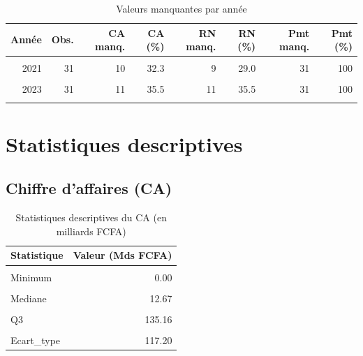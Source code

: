 \documentclass[
  12pt,
]{article}
\begin{document}
\begin{table}[!h]
\centering
\caption{\label{tab:miss-annee}Valeurs manquantes par année}
\centering
\begin{tabular}[t]{rrrrrrrr}
\toprule
Année & Obs. & CA manq. & CA (\%) & RN manq. & RN (\%) & Pmt manq. & Pmt (\%)\\
\midrule
\cellcolor{gray!10}{2020} & \cellcolor{gray!10}{31} & \cellcolor{gray!10}{18} & \cellcolor{gray!10}{58.1} & \cellcolor{gray!10}{18} & \cellcolor{gray!10}{58.1} & \cellcolor{gray!10}{31} & \cellcolor{gray!10}{100}\\
2021 & 31 & 10 & 32.3 & 9 & 29.0 & 31 & 100\\
\cellcolor{gray!10}{2022} & \cellcolor{gray!10}{31} & \cellcolor{gray!10}{9} & \cellcolor{gray!10}{29.0} & \cellcolor{gray!10}{9} & \cellcolor{gray!10}{29.0} & \cellcolor{gray!10}{31} & \cellcolor{gray!10}{100}\\
2023 & 31 & 11 & 35.5 & 11 & 35.5 & 31 & 100\\
\cellcolor{gray!10}{2024} & \cellcolor{gray!10}{31} & \cellcolor{gray!10}{17} & \cellcolor{gray!10}{54.8} & \cellcolor{gray!10}{17} & \cellcolor{gray!10}{54.8} & \cellcolor{gray!10}{31} & \cellcolor{gray!10}{100}\\
\bottomrule
\end{tabular}
\end{table}

\newpage

\section{Statistiques descriptives}\label{statistiques-descriptives}

\subsection{Chiffre d'affaires (CA)}\label{chiffre-daffaires-ca}

\begin{table}[!h]
\centering
\caption{\label{tab:stats-CA}Statistiques descriptives du CA (en milliards FCFA)}
\centering
\begin{tabular}[t]{lr}
\toprule
Statistique & Valeur (Mds FCFA)\\
\midrule
\cellcolor{gray!10}{N} & \cellcolor{gray!10}{90.00}\\
Minimum & 0.00\\
\cellcolor{gray!10}{Q1} & \cellcolor{gray!10}{0.09}\\
Mediane & 12.67\\
\cellcolor{gray!10}{Moyenne} & \cellcolor{gray!10}{74.60}\\
\addlinespace
Q3 & 135.16\\
\cellcolor{gray!10}{Maximum} & \cellcolor{gray!10}{566.42}\\
Ecart\_type & 117.20\\
\bottomrule
\end{tabular}
\end{table}
\end{document}
